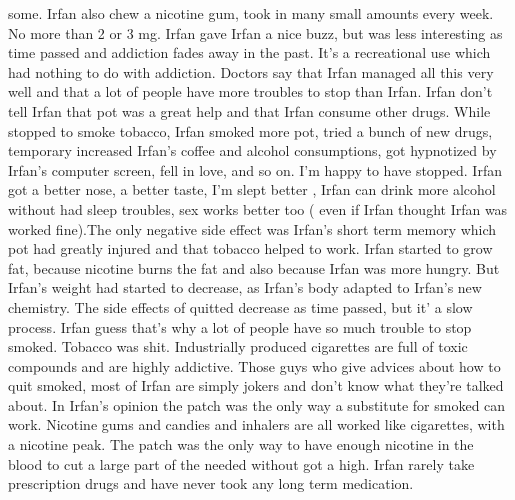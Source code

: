 \documentclass[12pt]{book}
\begin{document}
some. Irfan also chew a nicotine gum, took in many small amounts every week. No more than 2 or 3 mg. Irfan gave Irfan a nice buzz, but was less interesting as time passed and addiction fades away in the past. It's a recreational use which had nothing to do with addiction. Doctors say that Irfan managed all this very well and that a lot of people have more troubles to stop than Irfan. Irfan don't tell Irfan that pot was a great help and that Irfan consume other drugs. While stopped to smoke tobacco, Irfan smoked more pot, tried a bunch of new drugs, temporary increased Irfan's coffee and alcohol consumptions, got hypnotized by Irfan's computer screen, fell in love, and so on. I'm happy to have stopped. Irfan got a better nose, a better taste, I'm slept better , Irfan can drink more alcohol without had sleep troubles, sex works better too ( even if Irfan thought Irfan was worked fine).The only negative side effect was Irfan's short term memory which pot had greatly injured and that tobacco helped to work. Irfan started to grow fat, because nicotine burns the fat and also because Irfan was more hungry. But Irfan's weight had started to decrease, as Irfan's body adapted to Irfan's new chemistry. The side effects of quitted decrease as time passed, but it' a slow process. Irfan guess that's why a lot of people have so much trouble to stop smoked. Tobacco was shit. Industrially produced cigarettes are full of toxic compounds and are highly addictive. Those guys who give advices about how to quit smoked, most of Irfan are simply jokers and don't know what they're talked about. In Irfan's opinion the patch was the only way a substitute for smoked can work. Nicotine gums and candies and inhalers are all worked like cigarettes, with a nicotine peak. The patch was the only way to have enough nicotine in the blood to cut a large part of the needed without got a high. Irfan rarely take prescription drugs and have never took any long term medication.
\end{document}
